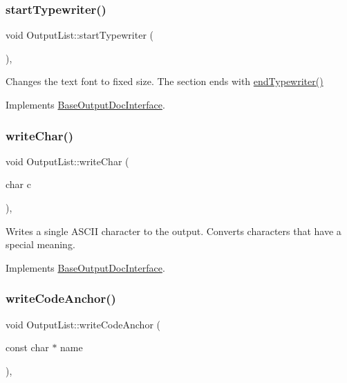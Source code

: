 \subsubsection{\texorpdfstring{startTypewriter()}{startTypewriter()}}
{\footnotesize\ttfamily void Output\+List\+::start\+Typewriter (\begin{DoxyParamCaption}{ }\end{DoxyParamCaption})\hspace{0.3cm}{\ttfamily [inline]}, {\ttfamily [virtual]}}

Changes the text font to fixed size. The section ends with \mbox{\hyperlink{class_output_list_ad83302c45e73f387c9dc13789df012f7}{end\+Typewriter()}} 

Implements \mbox{\hyperlink{class_base_output_doc_interface_abde41a60b900d35b0b198f43731c1cd0}{Base\+Output\+Doc\+Interface}}.

\mbox{\label{class_output_list_a188c7a8f0a0dc35ec5ea0f8b4a491d33}} 
\subsubsection{\texorpdfstring{writeChar()}{writeChar()}}
{\footnotesize\ttfamily void Output\+List\+::write\+Char (\begin{DoxyParamCaption}\item[{char}]{c }\end{DoxyParamCaption})\hspace{0.3cm}{\ttfamily [inline]}, {\ttfamily [virtual]}}

Writes a single A\+S\+C\+II character to the output. Converts characters that have a special meaning. 

Implements \mbox{\hyperlink{class_base_output_doc_interface_a1577324720c1c71142dff84ae80b058d}{Base\+Output\+Doc\+Interface}}.

\mbox{\label{class_output_list_ad40cf8ca8c6289590afa5871b8d5d9a0}} 
\subsubsection{\texorpdfstring{writeCodeAnchor()}{writeCodeAnchor()}}
{\footnotesize\ttfamily void Output\+List\+::write\+Code\+Anchor (\begin{DoxyParamCaption}\item[{const char $\ast$}]{name }\end{DoxyParamCaption})\hspace{0.3cm}{\ttfamily [inline]}, {\ttfamily [virtual]}}


